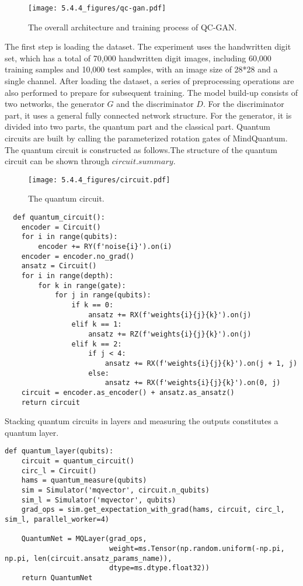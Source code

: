 \begin{figure}[ht]
  \centering
  \texttt{[image: 5.4.4\_figures/qc-gan.pdf]}
  \caption{\label{qc-gan} The overall architecture and training process of QC-GAN.}
\end{figure}

The first step is loading the dataset. The experiment uses the handwritten digit set, which has a total of 70,000 handwritten digit images, including 60,000 training samples and 10,000 test samples, with an image size of 28*28 and a single channel. After loading the dataset, a series of preprocessing operations are also performed to prepare for subsequent training. The model build-up consists of two networks, the generator ${G}$ and the discriminator ${D}$. For the discriminator part, it uses a general fully connected network structure. For the generator, it is divided into two parts, the quantum part and the classical part. Quantum circuits are built by calling the parameterized rotation gates of MindQuantum. The quantum circuit is constructed as follows.The structure of the quantum circuit can be shown through ${circuit.summary}$.
\begin{figure*}[htbp]
  \centering
  \texttt{[image: 5.4.4\_figures/circuit.pdf]}
  \caption{\label{quantum-circuit} The quantum circuit.}
\end{figure*}

\begin{lstlisting}
  def quantum_circuit():
    encoder = Circuit()
    for i in range(qubits):
        encoder += RY(f'noise{i}').on(i)
    encoder = encoder.no_grad()
    ansatz = Circuit()
    for i in range(depth):
        for k in range(gate):
            for j in range(qubits):
                if k == 0:
                    ansatz += RX(f'weights{i}{j}{k}').on(j)
                elif k == 1:
                    ansatz += RZ(f'weights{i}{j}{k}').on(j)
                elif k == 2:
                    if j < 4:
                        ansatz += RX(f'weights{i}{j}{k}').on(j + 1, j)
                    else:
                        ansatz += RX(f'weights{i}{j}{k}').on(0, j)
    circuit = encoder.as_encoder() + ansatz.as_ansatz()
    return circuit
\end{lstlisting}
Stacking quantum circuits in layers and measuring the outputs constitutes a quantum layer.
\begin{lstlisting}
def quantum_layer(qubits):
    circuit = quantum_circuit()
    circ_l = Circuit()
    hams = quantum_measure(qubits)
    sim = Simulator('mqvector', circuit.n_qubits)
    sim_l = Simulator('mqvector', qubits)
    grad_ops = sim.get_expectation_with_grad(hams, circuit, circ_l, sim_l, parallel_worker=4)

    QuantumNet = MQLayer(grad_ops,
                         weight=ms.Tensor(np.random.uniform(-np.pi, np.pi, len(circuit.ansatz_params_name)),
                         dtype=ms.dtype.float32))
    return QuantumNet
\end{lstlisting}

